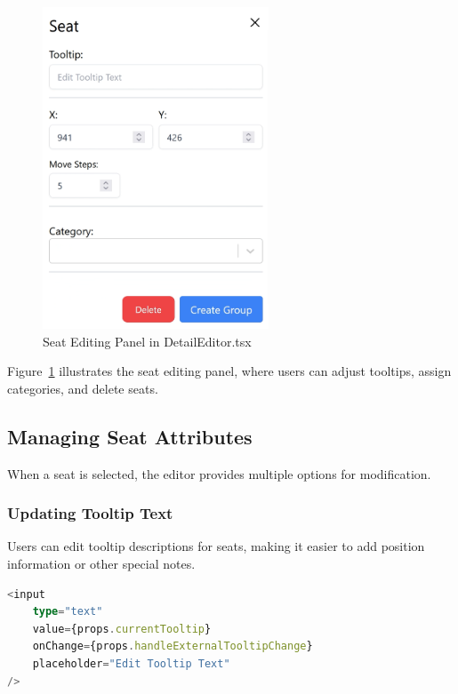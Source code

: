 \begin{figure}[H]
    \centering
    \includegraphics[width=0.6\textwidth]{pics/DetailEditorSeat.png}
    \caption{Seat Editing Panel in DetailEditor.tsx}
    \label{fig:detail-editor-seat}
\end{figure}

Figure~\ref{fig:detail-editor-seat} illustrates the seat editing panel, where users can adjust tooltips, assign categories, and delete seats.

\subsection{Managing Seat Attributes}
When a seat is selected, the editor provides multiple options for modification.

\subsubsection{Updating Tooltip Text}
Users can edit tooltip descriptions for seats, making it easier to add position information or other special notes.

\begin{lstlisting}[language=TypeScript, caption=Updating Tooltip for Selected Seats, label=lst:update-tooltip]
<input
    type="text"
    value={props.currentTooltip}
    onChange={props.handleExternalTooltipChange}
    placeholder="Edit Tooltip Text"
/>
\end{lstlisting}

